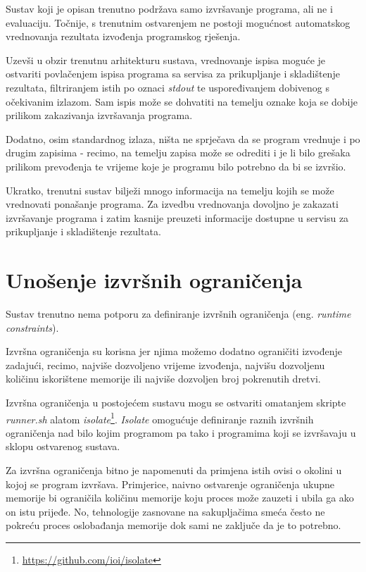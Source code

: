 \documentclass[times, utf8, zavrsni]{fer}
\begin{document}
{{Sustav koji je opisan trenutno podržava samo izvršavanje programa, ali ne i evaluaciju. Točnije, s trenutnim ostvarenjem ne postoji mogućnost automatskog vrednovanja rezultata izvođenja programskog rješenja.

Uzevši u obzir trenutnu arhitekturu sustava, vrednovanje ispisa moguće je ostvariti povlačenjem ispisa programa sa servisa za prikupljanje i skladištenje rezultata, filtriranjem istih po oznaci {\textit{stdout}} te uspoređivanjem dobivenog s očekivanim izlazom. Sam ispis može se dohvatiti na temelju oznake koja se dobije prilikom zakazivanja izvršavanja programa.

Dodatno, osim standardnog izlaza, ništa ne sprječava da se program vrednuje i po drugim zapisima - recimo, na temelju zapisa može se odrediti i je li bilo grešaka prilikom prevođenja te vrijeme koje je programu bilo potrebno da bi se izvršio.

Ukratko, trenutni sustav bilježi mnogo informacija na temelju kojih se može vrednovati ponašanje programa. Za izvedbu vrednovanja dovoljno je zakazati izvršavanje programa i zatim kasnije preuzeti informacije dostupne u servisu za prikupljanje i skladištenje rezultata.

\section{Unošenje izvršnih ograničenja}
\label{sec:runtimeconstraints}

Sustav trenutno nema potporu za definiranje izvršnih ograničenja (eng. {\textit{runtime constraints}}).

Izvršna ograničenja su korisna jer njima možemo dodatno ograničiti izvođenje zadajući, recimo, najviše dozvoljeno vrijeme izvođenja, najvišu dozvoljenu količinu iskorištene memorije ili najviše dozvoljen broj pokrenutih dretvi.

Izvršna ograničenja u postojećem sustavu mogu se ostvariti omatanjem skripte {\textit{runner.sh}} alatom {\textit{isolate}}\footnote{\url{https://github.com/ioi/isolate}}. {\textit{Isolate}} omogućuje definiranje raznih izvršnih ograničenja nad bilo kojim programom pa tako i programima koji se izvršavaju u sklopu ostvarenog sustava.

Za izvršna ograničenja bitno je napomenuti da primjena istih ovisi o okolini u kojoj se program izvršava. Primjerice, naivno ostvarenje ograničenja ukupne memorije bi ograničila količinu memorije koju proces može zauzeti i ubila ga ako on istu prijeđe. No, tehnologije zasnovane na sakupljačima smeća često ne pokreću proces oslobađanja memorije dok sami ne zaključe da je to potrebno.

}}
\end{document}
